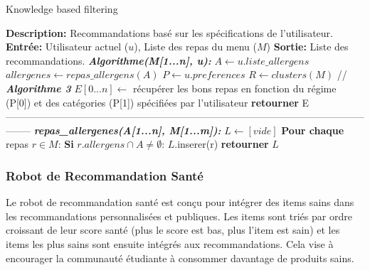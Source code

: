 \documentclass[11pt]{article}
\begin{document}
\begin{algorithm}
    \caption{Knowledge based filtering}
    \begin{algorithmic}[1]
        \Statex \textbf{Description:} Recommandations basé sur les spécifications de l'utilisateur.
        \Statex \textbf{Entrée:} Utilisateur actuel ($u$), Liste des repas du menu ($M$)
        \Statex \textbf{Sortie:} Liste des recommandations.
        \State \textbf{\textit{Algorithme(M[1...n], u):}}
        \State \hspace{0.5cm} $A \leftarrow u.liste\_allergens$
        \State \hspace{0.5cm} $allergenes \leftarrow repas\_allergens(A)$
        \State \hspace{0.5cm} $P \leftarrow u.preferences$
        \State \hspace{0.5cm} $R \leftarrow clusters(M)$ // \textbf{\textit{Algorithme 3}}
        \State \hspace{0.5cm} $E[0...n] \leftarrow$ récupérer les bons repas en fonction du régime (P[0]) et des
        \State \hspace{0.5cm} catégories (P[1]) spécifiées par l'utilisateur
        \State \hspace{0.5cm} \textbf{retourner} E
        \\
--------------------------------------------------------------------------------------------------------------------
        \State \textbf{\textit{repas\_allergenes(A[1...n], M[1...m]):}}
        \State \hspace{0.5cm} $L \leftarrow [vide]$
        \State \hspace{0.5cm} \textbf{Pour chaque} repas $r\in M$:
        \State \hspace{1cm} \textbf{Si} $r.allergens \cap A \neq \emptyset$:
        \State \hspace{1.5cm} $L$.inserer(r)
        \State \hspace{0.5cm} \textbf{retourner} $L$
    \end{algorithmic}
\end{algorithm}

\subsubsection{Robot de Recommandation Santé}
Le robot de recommandation santé est conçu pour intégrer des items sains dans les recommandations personnalisées et publiques. Les items sont triés par ordre croissant de leur score santé (plus le score est bas, plus l'item est sain) et les items les plus sains sont ensuite intégrés aux recommandations. Cela vise à encourager la communauté étudiante à consommer davantage de produits sains.
\end{document}
